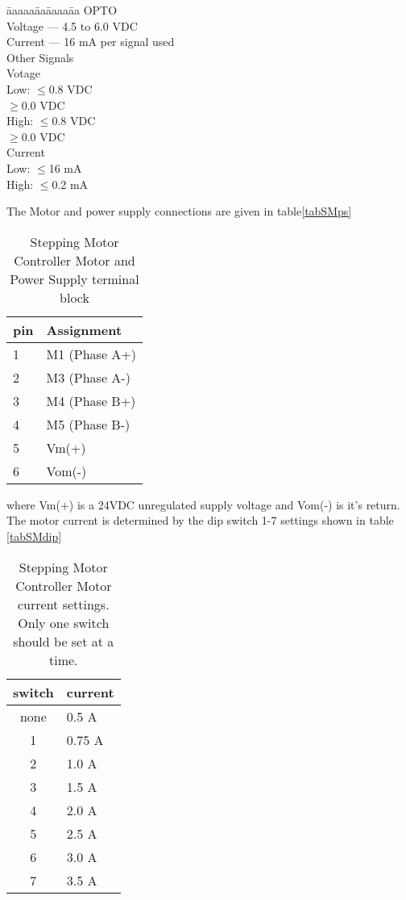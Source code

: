 \begin{tabbing}
\=aaaaa\=aa\=aaaa\=aa\kill
\>OPTO \\
\>  \>Voltage --- 4.5 to 6.0 VDC\\
\>  \>Current --- 16 mA per signal used\\
\>Other Signals\\
\>  \>Votage\\
\>  \>   \>Low:  \>$\leq$0.8 VDC\\
\>  \>   \>      \>$\geq$0.0 VDC\\
\>  \>   \>High: \>$\leq$0.8 VDC\\
\>  \>   \>      \> $\geq$0.0 VDC\\
\>  \>Current\\
\>  \>   \>Low:  \>$\leq$16 mA\\
\>  \>   \>High: \>$\leq$0.2 mA\\

\end{tabbing}
The Motor and power supply connections are given in table\ref{tabSMps}
\begin{table}[htb]
\begin{center}
\begin{tabular}{l|l} 
pin & Assignment \\ \hline
1  & M1 (Phase A+) \\
2  & M3 (Phase A-) \\
3  & M4 (Phase B+) \\
4  & M5 (Phase B-) \\
5  & Vm(+)\\
6  & Vom(-)\\
\end{tabular}
\caption[Stepping Motor Controller Motor and Power Supply terminal block]
        {Stepping Motor Controller Motor and Power Supply terminal block
        }
\end{center}
\end{table}
where Vm(+) is a 24VDC unregulated supply voltage and Vom(-) is it's return.
The motor current is determined by the dip switch 1-7 settings shown
in table \ref{tabSMdip}
\begin{table}[htb]
\begin{center}
\begin{tabular}{c|l} 
switch & current \\ \hline
none & 0.5 A \\
1  & 0.75 A \\
2  & 1.0 A \\
3  & 1.5 A \\
4  & 2.0 A \\
5  & 2.5 A \\
6  & 3.0 A \\
7  & 3.5 A \\
\end{tabular}
\caption[Stepping Motor Controller current settings]
        {Stepping Motor Controller Motor current settings.  Only one
         switch should be set at a time.
        }
\end{center}
\end{table}
